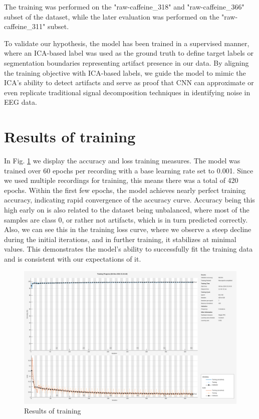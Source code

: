 \documentclass[12pt,a4paper,titlepage,openany]{report}
\begin{document}
The training was performed on the "raw-caffeine\_318" and "raw-caffeine\_366" subset of the dataset, while the later evaluation was performed on the "raw-caffeine\_311" subset.

To validate our hypothesis, the model has been trained in a supervised manner, where an ICA-based label was used as the ground truth to define target labels or segmentation boundaries representing artifact presence in our data. By aligning the training objective with ICA-based labels, we guide the model to mimic the ICA's ability to detect artifacts and serve as proof that CNN can approximate or even replicate traditional signal decomposition techniques in identifying noise in EEG data.

\section{Results of training}

In Fig. \ref{fig:training} we display the accuracy and loss training measures. The model was trained over 60 epochs per recording with a base learning rate set to 0.001. Since we used multiple recordings for training, this means there was a total of 420 epochs. Within the first few epochs, the model achieves nearly perfect training accuracy, indicating rapid convergence of the accuracy curve. Accuracy being this high early on is also related to the dataset being unbalanced, where most of the samples are class 0, or rather not artifacts, which is in turn predicted correctly.
Also, we can see this in the training loss curve, where we observe a steep decline during the initial iterations, and in further training, it stabilizes at minimal values.
This demonstrates the model's ability to successfully fit the training data and is consistent with our expectations of it.

\begin{figure}[H]
     \includegraphics[width=1\linewidth]{./training with 3 blocks/training_chart.png}
     \caption{Results of training}
     \label{fig:training}
\end{figure}
\end{document}
